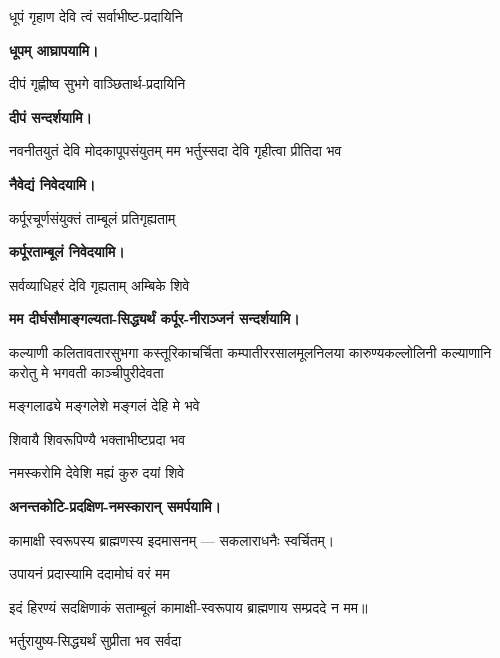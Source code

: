\begin{center}

{धूपं गृहाण देवि त्वं सर्वाभीष्ट-प्रदायिनि}

\textbf{\devAya{} धूपम् आघ्रापयामि।}
\medskip

{दीपं गृह्णीष्व सुभगे वाञ्छितार्थ-प्रदायिनि}

\textbf{\devAya{} दीपं सन्दर्शयामि।}
\medskip

{नवनीतयुतं देवि मोदकापूपसंयुतम्}
{मम भर्तुस्सदा देवि गृहीत्वा प्रीतिदा भव}

\textbf{\devAya{} नैवेद्यं निवेदयामि।}
\medskip

{कर्पूरचूर्णसंयुक्तं ताम्बूलं प्रतिगृह्यताम्}

\textbf{\devAya{} कर्पूरताम्बूलं निवेदयामि।}
\medskip

{सर्वव्याधिहरं देवि गृह्यताम् अम्बिके शिवे}

\textbf{\devAya{} मम दीर्घसौमाङ्गल्यता-सिद्ध्यर्थं कर्पूर-नीराञ्जनं सन्दर्शयामि।}
\medskip

{कल्याणी कलितावतारसुभगा कस्तूरिकाचर्चिता}
{कम्पातीररसालमूलनिलया कारुण्यकल्लोलिनी}
{कल्याणानि करोतु मे भगवती काञ्चीपुरीदेवता}

{मङ्गलाढ्ये मङ्गलेशे मङ्गलं देहि मे भवे}

{शिवायै शिवरूपिण्यै भक्ताभीष्टप्रदा भव}

{नमस्करोमि देवेशि मह्यं कुरु दयां शिवे}

\textbf{\devAya{} अनन्तकोटि-प्रदक्षिण-नमस्कारान् समर्पयामि।}
\medskip

कामाक्षी स्वरूपस्य ब्राह्मणस्य इदमासनम् — सकलाराधनैः स्वर्चितम्। 

{उपायनं प्रदास्यामि ददामोघं वरं मम}

इदं हिरण्यं सदक्षिणाकं सताम्बूलं कामाक्षी-स्वरूपाय ब्राह्मणाय सम्प्रददे न मम॥

\bigskip


{भर्तुरायुष्य-सिद्ध्यर्थं सुप्रीता भव सर्वदा}

\end{center}

